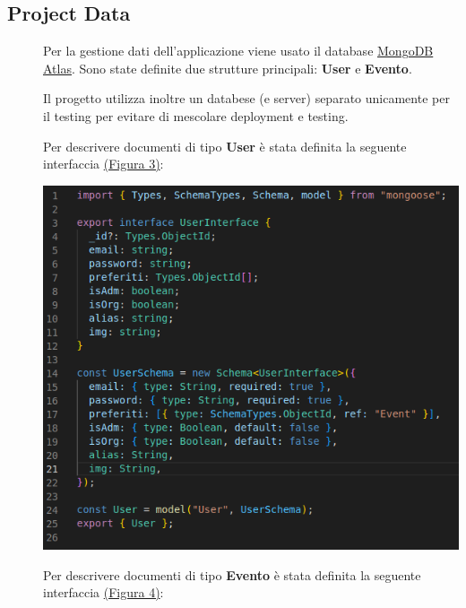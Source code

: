 \documentclass{article}
\begin{document}
\subsection{Project Data}
\begin{description}
    \item[] Per la gestione dati dell'applicazione viene usato il database \href{https://www.mongodb.com/atlas}{MongoDB Atlas}. Sono state definite due strutture principali: \textbf{User} e \textbf{Evento}.
    \item[] Il progetto utilizza inoltre un databese (e server) separato unicamente per il testing per evitare di mescolare deployment e testing.
    \item[] Per descrivere documenti di tipo \textbf{User} è stata definita la seguente interfaccia \hyperref[img:3]{(Figura 3)}:
    \item[] \label{img:3} \begin{center}
            \includegraphics[scale=0.5]{UserInterface.png}
        \end{center}
        \clearpage
    \item[] Per descrivere documenti di tipo \textbf{Evento} è stata definita la seguente interfaccia \hyperref[img:4]{(Figura 4)}:
    \item[] \label{img:4} \begin{center}

\end{center}
\end{description}
\end{document}
